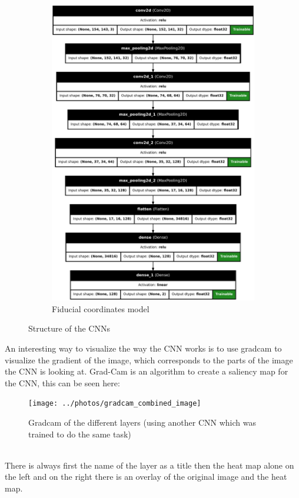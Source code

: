 \begin{figure}[H]
\begin{subfigure}{.5\textwidth}
        \includegraphics[width=.8\textwidth]{../photos/fiducial_coords_model}
        \caption[originalRainbow]{Fiducial coordinates model}
        \label{fig:fiducial_coords_model}
    \end{subfigure}
    \caption{Structure of the CNNs}
    \label{fig:CNN_structure}
\end{figure}
An interesting way to visualize the way the CNN works is to use gradcam\autocite{Selvaraju_2019} to visualize the gradient of the image, which corresponds to the parts of the image the CNN is looking at.
Grad-Cam is an algorithm to create a saliency map for the CNN, this can be seen here:
\begin{figure}[H]
    \centering
    \texttt{[image: ../photos/gradcam\_combined\_image]}
    \caption[cnn-gradcam]{Gradcam of the different layers (using another CNN which was trained to do the same task)}
    \label{fig:gradcam_combined_image}
\end{figure}\\
There is always first the name of the layer as a title then the heat map alone on the left and on the right there is an overlay of the original image and the heat map.


